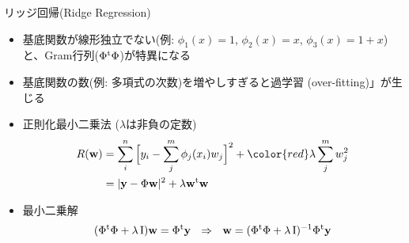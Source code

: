 \begin{frame}[t,fragile]{リッジ回帰(Ridge Regression)}
  \begin{itemize}
  \item 基底関数が線形独立でない(例: $\phi_1(x)=1$, $\phi_2(x)=x$, $\phi_3(x)=1+x$)と、Gram行列($\Phi^{\rm t} \Phi$)が特異になる
  \item 基底関数の数(例: 多項式の次数)を増やしすぎると過学習 (over-fitting)」が生じる
  \item 正則化最小二乗法 ($\lambda$は非負の定数)
    \begin{align*}
    R({\bf w}) &= \sum_i^n \Big[y_i - \sum_j^m \phi_j(x_i) w_j\Big]^2 + {\color{red} \lambda} \sum_j^m w_j^2 \\
    &= | {\bf y} - \Phi {\bf w} |^2 + \lambda {\bf w}^{\rm t} {\bf w}
    \end{align*}
  \item 最小二乗解
    \[
    (\Phi^{\rm t} \Phi + \lambda \, {\rm I}) {\bf w} = \Phi^{\rm t} {\bf y} \ \ \Rightarrow \ \ 
      {\bf w} = (\Phi^{\rm t} \Phi + \lambda \, {\rm I})^{-1}\Phi^{\rm t} {\bf y}
      \]
  \end{itemize}
\end{frame}
